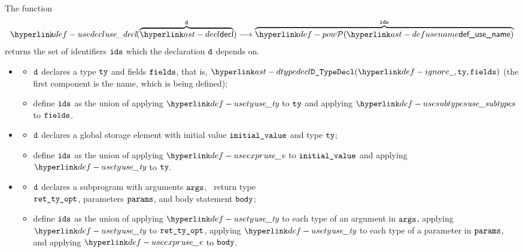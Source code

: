 \FormallyParagraph
{}

\hypertarget{def-usedecl}{}
The function
\[
\usedecl(\overname{\decl}{\vd}) \aslto \overname{\pow{\defusename}}{\ids}
\]
returns the set of identifiers $\texttt{ids}$ which the declaration $\texttt{d}$ depends on.

\ProseParagraph
\OneApplies
\begin{itemize}
  \item {}
  \begin{itemize}
    \item $\texttt{d}$ declares a type $\texttt{ty}$ and fields $\texttt{fields}$, that is,
          $\DTypeDecl(\Ignore, \tty, \fields)$ (the first component is the name, which is being defined);
    \item define $\texttt{ids}$ as the union of applying $\usety$ to $\texttt{ty}$ and applying $\usesubtypes$ to $\texttt{fields}$.
  \end{itemize}

  \item {}
  \begin{itemize}
    \item $\texttt{d}$ declares a global storage element with initial value $\texttt{initial\_value}$ and type $\texttt{ty}$;
    \item define $\texttt{ids}$ as the union of applying $\useexpr$ to $\texttt{initial\_value}$ and applying $\usety$ to $\texttt{ty}$.
  \end{itemize}

  \item {}
  \begin{itemize}
    \item $\texttt{d}$ declares a subprogram with arguments $\texttt{args}$, \optional\ return type \\
          $\texttt{ret\_ty\_opt}$, parameters $\texttt{params}$, and body statement $\texttt{body}$;
    \item define $\texttt{ids}$ as the union of applying $\usety$ to each type of an argument in $\texttt{args}$,
          applying $\usety$ to $\texttt{ret\_ty\_opt}$, applying $\usety$ to each type of a parameter in $\texttt{params}$,
          and applying $\useexpr$ to $\texttt{body}$.
  \end{itemize}
\end{itemize}

